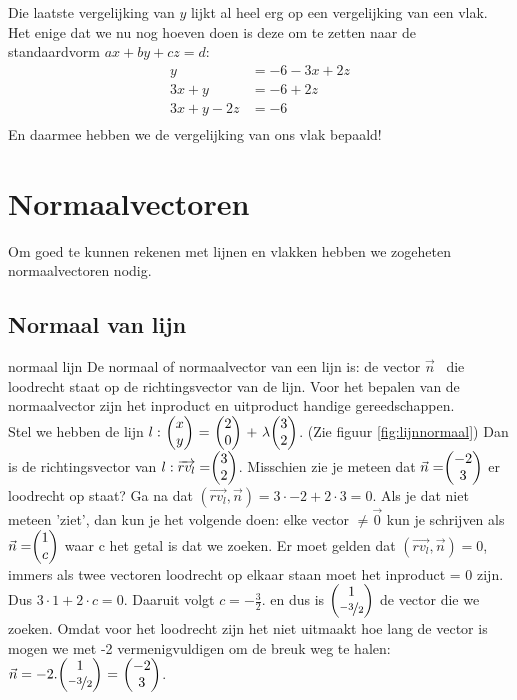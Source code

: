 Die laatste vergelijking van $y$ lijkt al heel erg op een vergelijking van een vlak. Het enige dat we nu nog hoeven doen is deze om te zetten naar de standaardvorm $ax + by + cz = d$:
\begin{align*}
  y &= -6 -3x + 2z \\
  3x + y &= -6 + 2z \\
  3x + y - 2z &= -6 \\
\end{align*}
En daarmee hebben we de vergelijking van ons vlak bepaald!


\section{Normaalvectoren}
Om goed te kunnen rekenen met lijnen en vlakken hebben we zogeheten normaalvectoren nodig.

\subsection{Normaal van lijn}
\mydef
{normaal lijn}
{De normaal of normaalvector van een lijn is: 
	de vector $ \vec{n} $  \ die loodrecht staat op de richtingsvector van de lijn.} Voor het bepalen van de normaalvector zijn het inproduct en uitproduct handige gereedschappen. \\

Stel we hebben de lijn $ l: \  \vectwee {x}{y} \ = \ \vectwee {2}{0} \ +\  \lambda  \vectwee {3}{2}  $. (Zie figuur  \ref{fig:lijnnormaal})
Dan is de richtingsvector van $ l:  \overrightarrow{rv_{l}} =  \vectwee {3}{2} $. Misschien zie je meteen dat $ \vec{n} =  \vectwee {-2}{3} $ er loodrecht op staat? Ga na dat  $ (\overrightarrow{rv_{l} }, \vec{n}) = 3\cdot-2 + 2\cdot3  = 0 $. Als je dat niet meteen 'ziet', dan kun je het volgende doen: elke vector  $ \ne \vec{0} $ kun je schrijven als  $ \vec{n} = \vectwee {1}{c} $ waar c het getal is dat we zoeken. Er moet gelden dat  $ (\overrightarrow{rv_{l} }, \vec{n}) = 0 $, immers als twee vectoren loodrecht op elkaar staan moet het inproduct = 0 zijn. Dus $ 3\cdot 1 + 2\cdot c = 0 $. Daaruit volgt $ c =  -\frac{3}{2}. $ en dus is $ \vectwee {1}{\nicefrac{-3}{2}} $ de vector die we zoeken. Omdat voor het loodrecht zijn het niet uitmaakt hoe lang de vector is mogen we met -2 vermenigvuldigen om de breuk weg te halen: $ \vec{n} = -2.\vectwee {1}{\nicefrac{-3}{2}} \ = \  \vectwee {-2}{3} $. 


